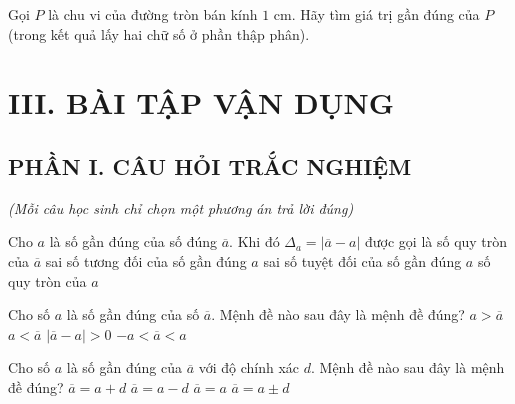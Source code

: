 \begin{vd}
	Gọi $P$ là chu vi của đường tròn bán kính $1\text{ cm}$. Hãy tìm giá trị gần đúng của $P$ (trong kết quả lấy hai chữ số ở phần thập phân).
\end{vd}

\vspace{0.4cm}
\section*{III. BÀI TẬP VẬN DỤNG}

\subsection*{PHẦN I. CÂU HỎI TRẮC NGHIỆM}
\textit{\small (Mỗi câu học sinh chỉ chọn một phương án trả lời đúng)}
\setcounter{ex}{0}

\begin{ex}
	Cho $a$ là số gần đúng của số đúng $\overline{a}$. Khi đó $\Delta_a = |\overline{a} - a|$ được gọi là
	\choice
	{số quy tròn của $\overline{a}$}
	{sai số tương đối của số gần đúng $a$}
	{\True sai số tuyệt đối của số gần đúng $a$}
	{số quy tròn của $a$}
\end{ex}

\begin{ex}
	Cho số $a$ là số gần đúng của số $\overline{a}$. Mệnh đề nào sau đây là mệnh đề đúng?
	\choice
	{$a > \overline{a}$}
	{$a < \overline{a}$}
	{\True $|\overline{a} - a| > 0$}
	{$-a < \overline{a} < a$}
\end{ex}

\begin{ex}
	Cho số $a$ là số gần đúng của $\overline{a}$ với độ chính xác $d$. Mệnh đề nào sau đây là mệnh đề đúng?
	\choice
	{$\overline{a} = a + d$}
	{$\overline{a} = a - d$}
	{$\overline{a} = a$}
	{\True $\overline{a} = a \pm d$}
\end{ex}

